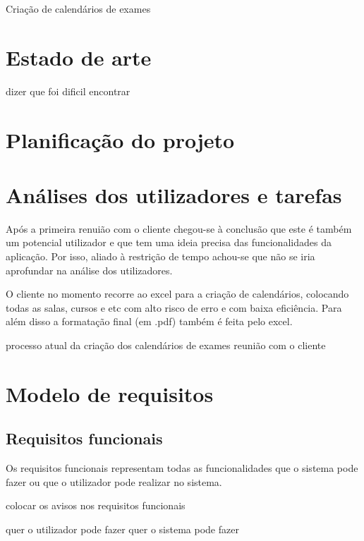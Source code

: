 \documentclass[11pt, twoside]{report}
\begin{document}
	Criação de calendários de exames
	
	\chapter{Estado de arte}
	
	
	dizer que foi dificil encontrar
	
	\chapter{Planificação do projeto}

 	

	\chapter{Análises dos utilizadores e tarefas}
	
	Após a primeira renuião com o cliente chegou-se à conclusão que  este é também um potencial utilizador e que tem uma ideia precisa das funcionalidades da aplicação. Por isso, aliado à restrição de tempo achou-se que não se iria aprofundar na análise dos utilizadores. 
	
	O cliente no momento recorre ao excel para a criação de calendários,  colocando todas as salas, cursos e etc com alto risco de erro e com baixa eficiência. Para além disso a formatação final (em .pdf) também é feita pelo excel.

	
	



	processo atual da criação dos calendários de exames
	reunião com o cliente
	
	\chapter{Modelo de requisitos}
	\section{Requisitos funcionais}
	
	

	\pagebreak %
	Os requisitos funcionais representam todas as funcionalidades que o sistema pode fazer ou que o utilizador pode realizar no sistema. 
	
	colocar os avisos nos requisitos funcionais
	
	quer o utilizador pode fazer quer o sistema pode fazer
	
\end{document}
